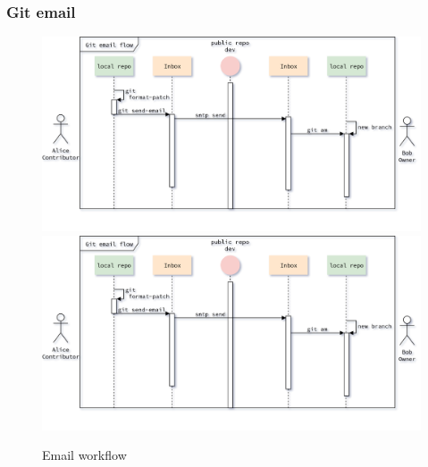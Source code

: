 \begin{frame}[noframenumbering]
    \frametitle{Git email}
    \addtocounter{page}{-1}
    \begin{figure}
        \begin{center}
            {
                \includegraphics[height=0.7\textheight,keepaspectratio]{./images/EmailWorkflow_ApplyAndTest.png}
            }
            {
                \includegraphics[height=0.75\textheight,keepaspectratio]{./images/EmailWorkflow_ApplyAndTest.png}
            }
            \caption{Email workflow}
        \end{center}
    \end{figure}
\end{frame}

